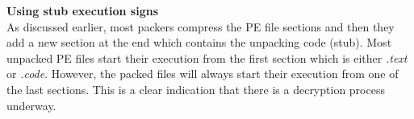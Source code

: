 \textbf{Using stub execution signs}\\
As discussed earlier, most packers compress the PE file sections and then they add a new section at the end which contains the unpacking code (stub). Most unpacked PE files start their execution from the first section which is either \textit{.text} or \textit{.code}. However, the packed files will always start their execution from one of the last sections. This is a clear indication that there is a decryption process underway.